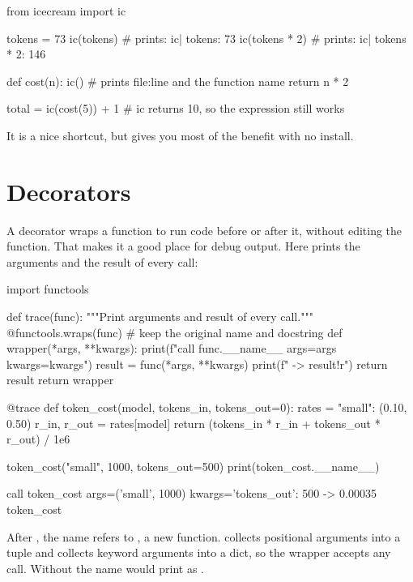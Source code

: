 \begin{pycode}
from icecream import ic

tokens = 73
ic(tokens)                 # prints: ic| tokens: 73
ic(tokens * 2)             # prints: ic| tokens * 2: 146


def cost(n):
    ic()                   # prints file:line and the function name
    return n * 2


total = ic(cost(5)) + 1    # ic returns 10, so the expression still works
\end{pycode}

It is a nice shortcut, but  gives you most of the benefit with no install.

\section{Decorators}

A decorator wraps a function to run code before or after it, without editing the function. That makes it a good place for debug output.
Here  prints the arguments and the result of every call:

\begin{pycode}
import functools


def trace(func):
    """Print arguments and result of every call."""
    @functools.wraps(func)              # keep the original name and docstring
    def wrapper(*args, **kwargs):
        print(f"call {func.__name__} args={args} kwargs={kwargs}")
        result = func(*args, **kwargs)
        print(f"  -> {result!r}")
        return result
    return wrapper


@trace
def token_cost(model, tokens_in, tokens_out=0):
    rates = {"small": (0.10, 0.50)}
    r_in, r_out = rates[model]
    return (tokens_in * r_in + tokens_out * r_out) / 1e6


token_cost("small", 1000, tokens_out=500)
print(token_cost.__name__)
\end{pycode}
\begin{rawcode}
call token_cost args=('small', 1000) kwargs={'tokens_out': 500}
  -> 0.00035
token_cost
\end{rawcode}

\begin{typecheck}
After , the name  refers to , a new function.  collects positional arguments into a
tuple and  collects keyword arguments into a dict, so the wrapper accepts any call. Without 
the name would print as .
\end{typecheck}

